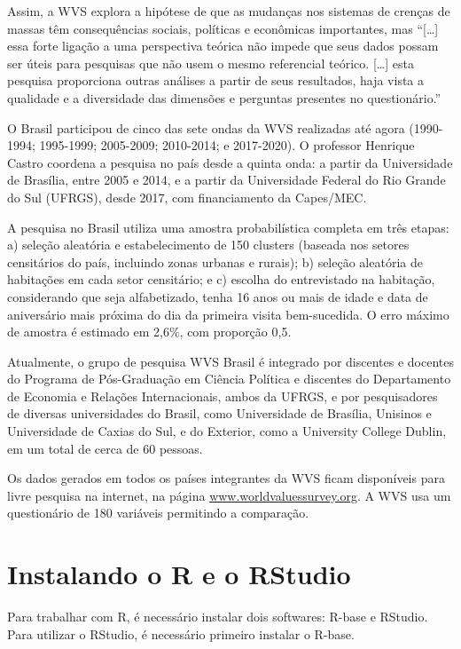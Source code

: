 \documentclass[
  10pt,
  brazil,
  a4paper,
  twoside, notitlepage, openright]{book}
\begin{document}
Assim, a WVS explora a hipótese de que as mudanças nos sistemas de crenças de massas têm consequências sociais, políticas e econômicas importantes, mas ``{[}\ldots{]} essa forte ligação a uma perspectiva teórica não impede que seus dados possam ser úteis para pesquisas que não usem o mesmo referencial teórico. {[}\ldots{]} esta pesquisa proporciona outras análises a partir de seus resultados, haja vista a qualidade e a diversidade das dimensões e perguntas presentes no questionário.'' \citep{castro_conteudo_2015}

O Brasil participou de cinco das sete ondas da WVS realizadas até agora (1990-1994; 1995-1999; 2005-2009; 2010-2014; e 2017-2020). O professor Henrique Castro coordena a pesquisa no país desde a quinta onda: a partir da Universidade de Brasília, entre 2005 e 2014, e a partir da Universidade Federal do Rio Grande do Sul (UFRGS), desde 2017, com financiamento da Capes/MEC.

A pesquisa no Brasil utiliza uma amostra probabilística completa em três etapas: a) seleção aleatória e estabelecimento de 150 clusters (baseada nos setores censitários do país, incluindo zonas urbanas e rurais); b) seleção aleatória de habitações em cada setor censitário; e c) escolha do entrevistado na habitação, considerando que seja alfabetizado, tenha 16 anos ou mais de idade e data de aniversário mais próxima do dia da primeira visita bem-sucedida. O erro máximo de amostra é estimado em 2,6\%, com proporção 0,5.

Atualmente, o grupo de pesquisa WVS Brasil é integrado por discentes e docentes do Programa de Pós-Graduação em Ciência Política e discentes do Departamento de Economia e Relações Internacionais, ambos da UFRGS, e por pesquisadores de diversas universidades do Brasil, como Universidade de Brasília, Unisinos e Universidade de Caxias do Sul, e do Exterior, como a University College Dublin, em um total de cerca de 60 pessoas.

Os dados gerados em todos os países integrantes da WVS ficam disponíveis para livre pesquisa na internet, na página \url{www.worldvaluessurvey.org}. A WVS usa um questionário de 180 variáveis permitindo a comparação.

\hypertarget{instalando-o-r-e-o-rstudio}{%
\chapter{Instalando o R e o RStudio}\label{instalando-o-r-e-o-rstudio}}

Para trabalhar com R, é necessário instalar dois softwares: R-base e RStudio. Para utilizar o RStudio, é necessário primeiro instalar o R-base.
\end{document}
